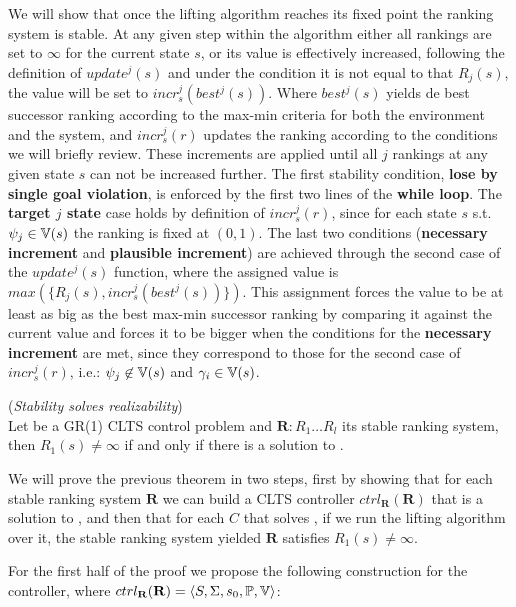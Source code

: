 We will show that once the lifting algorithm reaches its fixed point the ranking system is stable.
At any given step within the algorithm either all rankings are set to $\infty$ for the current state $s$, or its value is effectively increased, following the definition of $update^j(s)$ and under the condition it is not equal to that $R_j(s)$, the value will be set to $incr_s^j(best^j(s))$.  Where $best^j(s)$ yields de best successor ranking according to the max-min criteria for both the environment and the system, and $incr_s^j(r)$ updates the ranking according to the conditions we will briefly review. These increments are applied until all $j$ rankings at any given state $s$ can not be increased further. The first stability condition, \textbf{lose by single goal violation}, is enforced by the first two lines of the \textbf{while loop}. The \textbf{target $j$ state} case holds by definition of $incr_s^j(r)$, since for each state $s$ s.t. $\psi_j \in \mathbb{V}(s)$ the ranking is fixed at $(0,1)$. The last two conditions (\textbf{necessary increment} and \textbf{plausible increment}) are achieved through the second case of the $update^j(s)$ function, where the assigned value is $max(\{R_j(s),incr_s^j(best^j(s))\})$. This assignment forces the value to be at least as big as the best max-min successor ranking by comparing it against the current value and forces it to be bigger when the conditions for the \textbf{necessary increment} are met, since they correspond to those for the second case of $incr_s^j(r)$, i.e.: $\psi_j \not\in \mathbb{V}(s)$ and $\gamma_i \in \mathbb{V}(s)$. 

\begin{theorem}(\emph{Stability solves realizability})\label{theorem:gr1_stability_realizability}\\
	Let \controlProblemDef be a GR(1) CLTS control problem and $\mathbf{R}:R_1 \ldots R_l$ its stable ranking system, then $R_1(s) \neq \infty$ if and only if there is a solution to \controlProblem.
	\normalsize
\end{theorem}

We will prove the previous theorem in two steps, first by showing that for each stable ranking system $\mathbf{R}$ we can build a CLTS controller $ctrl_{\mathbf{R}}(\mathbf{R})$ that is a solution to \controlProblem, and then that for each $C$ that solves \controlProblem, if we run the lifting algorithm over it, the stable ranking system yielded $\mathbf{R}$ satisfies $R_1(s) \neq \infty$.

For the first half of the proof we propose the following construction for the controller, where $ctrl_{\mathbf{R}}(\mathbf{R})= \langle S, \Sigma, s_0, \mathbb{P}, \mathbb{V} \rangle$:

